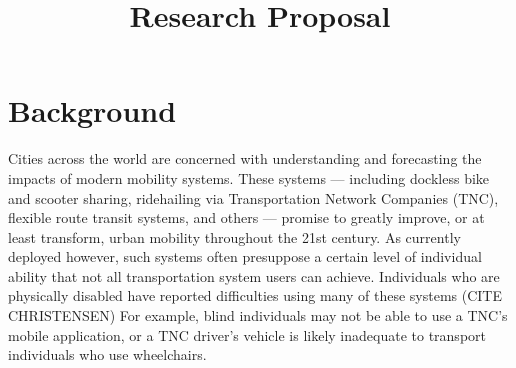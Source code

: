 \documentclass{article}
\title{Research Proposal}
\begin{document}
\maketitle

\section{Background}

Cities across the world are concerned with understanding and forecasting the
impacts of modern mobility systems. These systems --- including dockless bike
and scooter sharing, ridehailing via Transportation Network Companies (TNC),
flexible route transit systems, and others --- promise to greatly improve, or at
least transform, urban mobility throughout the 21st century. As currently
deployed however, such systems often presuppose a certain level of individual
ability that not all transportation system users can achieve. Individuals who
are physically disabled have reported difficulties using many of these systems
(CITE CHRISTENSEN) For example, blind individuals may not be able to use a TNC's
mobile application, or a TNC driver's vehicle is likely inadequate to transport
individuals who use wheelchairs.
\end{document}
